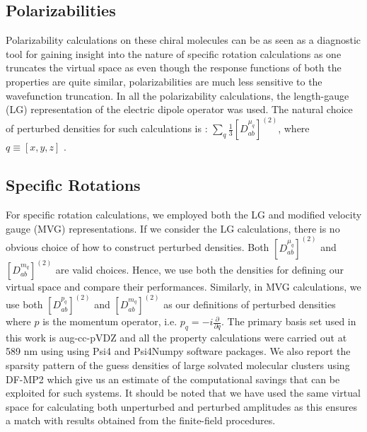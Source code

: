 \subsection{Polarizabilities}
Polarizability calculations on these chiral molecules can be as seen as a diagnostic 
tool for gaining insight into the nature of specific rotation calculations as one 
truncates the virtual space as even though the response functions of 
both the properties are quite similar, polarizabilities are much less sensitive to the 
wavefunction truncation. In all the polarizability calculations, the length-gauge 
(LG) representation of the electric dipole operator was used. The natural choice of 
perturbed densities for such calculations is : $\sum\limits_q \frac{1}{3}[{D^{\mu_q}_{ab}}]^{(2)}$,
where $q \equiv [x,y,z]$ . 
\subsection{Specific Rotations}
For specific rotation calculations, we employed both the LG and modified velocity gauge (MVG)\cite{} 
representations. If we consider the LG calculations, there is no obvious
choice of how to construct perturbed densities. Both $[{D^{\mu_q}_{ab}}]^{(2)}$ 
and $[{D^{m_q}_{ab}}]^{(2)}$ are valid choices. Hence, we use both the densities
for defining our virtual space and compare their performances.
Similarly, in MVG calculations, we use both $[{D^{p_q}_{ab}}]^{(2)}$ 
and $[{D^{m_q}_{ab}}]^{(2)}$ as our definitions of 
perturbed densities where $p$ is the momentum operator, i.e. 
$p_q = -i\frac{\partial}{\partial{q}}$. 
The primary basis set used in this work is aug-cc-pVDZ\cite{}
and all the property calculations were carried out at 589 nm using 
using Psi4 and Psi4Numpy software packages.\cite{}
We also report the sparsity pattern of the guess densities of large
solvated molecular clusters using DF-MP2 which give us an estimate of 
the computational savings that can be exploited for such systems. It should 
be noted that we have used the same virtual space for calculating both unperturbed 
and perturbed amplitudes as this ensures a match with results obtained from 
the finite-field procedures. 
